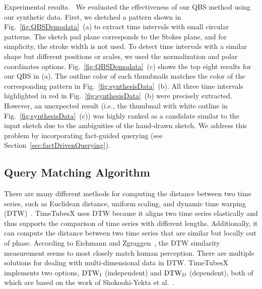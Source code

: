\textsf{Experimental results.\ } We evaluated the effectiveness of our QBS method using our synthetic data.
First, we sketched a pattern shown in Fig.~\ref{fig:QBSDemodata}~(a) to extract time intervals with small circular patterns.
The sketch pad plane corresponds to the Stokes plane, and for simplicity, the stroke width is not used.
To detect time intervals with a similar shape but different positions or scales, we used the normalization and polar coordinates options.
Fig.~\ref{fig:QBSDemodata}~(c) shows the top eight results for our QBS in (a).
The outline color of each thumbnails matches the color of the corresponding pattern in Fig.~\ref{fig:synthesisData}~(b).
All three time intervals highlighted in red in Fig.~\ref{fig:synthesisData}~(b) were precisely extracted.
However, an unexpected result (i.e., the thumbnail with white outline in Fig.~\ref{fig:synthesisData}~(c)) was highly ranked as a candidate similar to the input sketch due to the ambiguities of the hand-drawn sketch.
We address this problem by incorporating fact-guided querying (see Section~\ref{sec:factDrivenQuerying}). 

\subsection{Query Matching Algorithm}\label{sec:matchingAlgorithm}
There are many different methods for computing the distance between two time series, such as Euclidean distance, uniform scaling, and dynamic time warping (DTW)~\cite{Berndt1994}.
TimeTubesX uses DTW
because it aligns two time series elastically and thus supports the comparison of time series with different lengths.
Additionally, it can compute the distance between two time series that are similar but locally out of phase.
According to Eichmann and Zgraggen~\cite{Eichmann2015}, the DTW similarity measurement seems to most closely match human perception.
There are multiple solutions for dealing with multi-dimensional data in DTW. 
TimeTubesX implements two options, ${\rm DTW}_{\rm I}$ (independent) and ${\rm DTW}_{\rm D}$ (dependent), both of which are based on the work of Shokoohi-Yekta et al.~\cite{Shokoohi-Yekta2015}.

